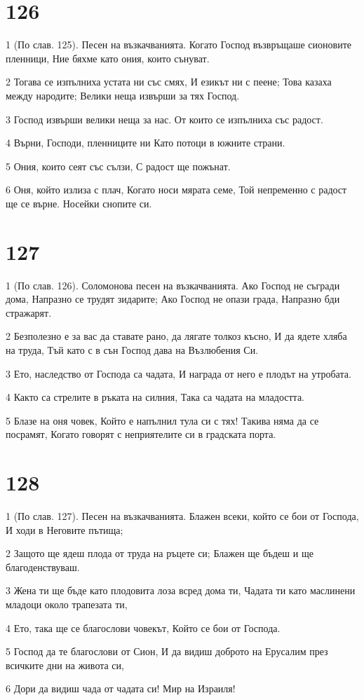 \chapter{126}

\par 1 (По слав. 125). Песен на възкачванията. Когато Господ възвръщаше сионовите пленници, Ние бяхме като ония, които сънуват.
\par 2 Тогава се изпълниха устата ни със смях, И езикът ни с пеене; Това казаха между народите; Велики неща извърши за тях Господ.
\par 3 Господ извърши велики неща за нас. От които се изпълниха със радост.
\par 4 Върни, Господи, пленниците ни Като потоци в южните страни.
\par 5 Ония, които сеят със сълзи, С радост ще пожънат.
\par 6 Оня, който излиза с плач, Когато носи мярата семе, Той непременно с радост ще се върне. Носейки снопите си.

\chapter{127}

\par 1 (По слав. 126). Соломонова песен на възкачванията. Ако Господ не съгради дома, Напразно се трудят зидарите; Ако Господ не опази града, Напразно бди стражарят.
\par 2 Безполезно е за вас да ставате рано, да лягате толкоз късно, И да ядете хляба на труда, Тъй като с в сън Господ дава на Възлюбения Си.
\par 3 Ето, наследство от Господа са чадата, И награда от него е плодът на утробата.
\par 4 Както са стрелите в ръката на силния, Така са чадата на младостта.
\par 5 Блазе на оня човек, Който е напълнил тула си с тях! Такива няма да се посрамят, Когато говорят с неприятелите си в градската порта.

\chapter{128}

\par 1 (По слав. 127). Песен на възкачванията. Блажен всеки, който се бои от Господа, И ходи в Неговите пътища;
\par 2 Защото ще ядеш плода от труда на ръцете си; Блажен ще бъдеш и ще благоденствуваш.
\par 3 Жена ти ще бъде като плодовита лоза всред дома ти, Чадата ти като маслинени младоци около трапезата ти,
\par 4 Ето, така ще се благослови човекът, Който се бои от Господа.
\par 5 Господ да те благослови от Сион, И да видиш доброто на Ерусалим през всичките дни на живота си,
\par 6 Дори да видиш чада от чадата си! Мир на Израиля!

